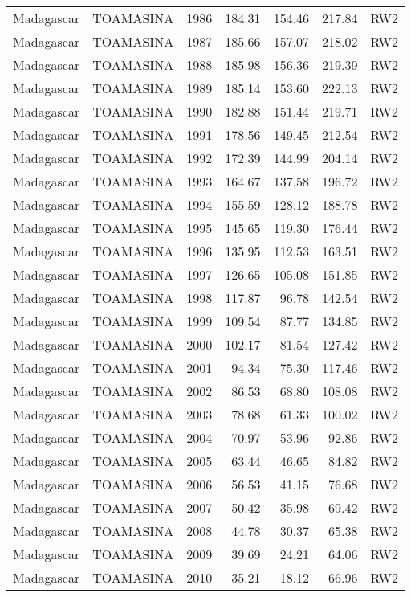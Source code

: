 \begin{longtable}{lllrrrl}
  Madagascar & TOAMASINA & 1986 & 184.31 & 154.46 & 217.84 & RW2 \\ 
  Madagascar & TOAMASINA & 1987 & 185.66 & 157.07 & 218.02 & RW2 \\ 
  Madagascar & TOAMASINA & 1988 & 185.98 & 156.36 & 219.39 & RW2 \\ 
  Madagascar & TOAMASINA & 1989 & 185.14 & 153.60 & 222.13 & RW2 \\ 
  Madagascar & TOAMASINA & 1990 & 182.88 & 151.44 & 219.71 & RW2 \\ 
  Madagascar & TOAMASINA & 1991 & 178.56 & 149.45 & 212.54 & RW2 \\ 
  Madagascar & TOAMASINA & 1992 & 172.39 & 144.99 & 204.14 & RW2 \\ 
  Madagascar & TOAMASINA & 1993 & 164.67 & 137.58 & 196.72 & RW2 \\ 
  Madagascar & TOAMASINA & 1994 & 155.59 & 128.12 & 188.78 & RW2 \\ 
  Madagascar & TOAMASINA & 1995 & 145.65 & 119.30 & 176.44 & RW2 \\ 
  Madagascar & TOAMASINA & 1996 & 135.95 & 112.53 & 163.51 & RW2 \\ 
  Madagascar & TOAMASINA & 1997 & 126.65 & 105.08 & 151.85 & RW2 \\ 
  Madagascar & TOAMASINA & 1998 & 117.87 & 96.78 & 142.54 & RW2 \\ 
  Madagascar & TOAMASINA & 1999 & 109.54 & 87.77 & 134.85 & RW2 \\ 
  Madagascar & TOAMASINA & 2000 & 102.17 & 81.54 & 127.42 & RW2 \\ 
  Madagascar & TOAMASINA & 2001 & 94.34 & 75.30 & 117.46 & RW2 \\ 
  Madagascar & TOAMASINA & 2002 & 86.53 & 68.80 & 108.08 & RW2 \\ 
  Madagascar & TOAMASINA & 2003 & 78.68 & 61.33 & 100.02 & RW2 \\ 
  Madagascar & TOAMASINA & 2004 & 70.97 & 53.96 & 92.86 & RW2 \\ 
  Madagascar & TOAMASINA & 2005 & 63.44 & 46.65 & 84.82 & RW2 \\ 
  Madagascar & TOAMASINA & 2006 & 56.53 & 41.15 & 76.68 & RW2 \\ 
  Madagascar & TOAMASINA & 2007 & 50.42 & 35.98 & 69.42 & RW2 \\ 
  Madagascar & TOAMASINA & 2008 & 44.78 & 30.37 & 65.38 & RW2 \\ 
  Madagascar & TOAMASINA & 2009 & 39.69 & 24.21 & 64.06 & RW2 \\ 
  Madagascar & TOAMASINA & 2010 & 35.21 & 18.12 & 66.96 & RW2 \\ 

\end{longtable}
